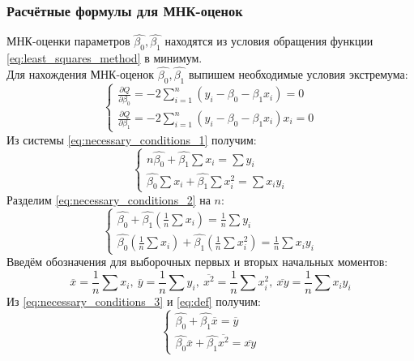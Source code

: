 \subsubsection{Расчётные формулы для МНК-оценок}
МНК-оценки параметров $\hat{\beta_0}, \hat{\beta_1}$ находятся из условия обращения функции \eqref{eq:least_squares_method} в минимум. \\
Для нахождения МНК-оценок $\hat{\beta_0}, \hat{\beta_1}$ выпишем необходимые условия экстремума:
\begin{equation} \label{eq:necessary_conditions_1}
	\begin{cases}
		\frac{\partial Q}{\partial \beta_0} = -2 \sum_{i=1}^{n} (y_i - \beta_0 - \beta_1 x_i) = 0 \\
		\frac{\partial Q}{\partial \beta_1} = -2 \sum_{i=1}^{n} (y_i - \beta_0 - \beta_1 x_i)x_i = 0 
	\end{cases}
\end{equation}
Из системы \eqref{eq:necessary_conditions_1} получим:
\begin{equation}
	\begin{cases} \label{eq:necessary_conditions_2}
		n \hat{\beta_0} + \hat{\beta_1} \sum x_i = \sum y_i \\
		\hat{\beta_0} \sum x_i + \hat{\beta_1} \sum x_{i}^2 = \sum x_i y_i
	\end{cases}
\end{equation}
Разделим \eqref{eq:necessary_conditions_2} на $n$:
\begin{equation} \label{eq:necessary_conditions_3}
	\begin{cases}
		\hat{\beta_0} + \hat{\beta_1} (\frac{1}{n} \sum x_i) = \frac{1}{n} \sum y_i \\
		\hat{\beta_0} (\frac{1}{n} \sum x_i) + \hat{\beta_1} (\frac{1}{n} \sum x_{i}^2) = \frac{1}{n} \sum x_i y_i
	\end{cases}
\end{equation}
Введём обозначения для выборочных первых и вторых начальных моментов:
\begin{equation} \label{eq:def}
	\overline{x} = \frac{1}{n} \sum x_i, \ \overline{y} = \frac{1}{n} \sum y_i, \ \overline{x^2} = \frac{1}{n} \sum x_{i}^2, \ \overline{x y} = \frac{1}{n} \sum x_i y_i
\end{equation}
Из \eqref{eq:necessary_conditions_3} и \eqref{eq:def} получим:
\begin{equation} \label{eq:necessary_conditions_fin}
	\begin{cases}
		\hat{\beta_0} + \hat{\beta_1} \overline{x} = \overline{y} \\
		\hat{\beta_0} \overline{x} + \hat{\beta_1} \overline{x^2} = \overline{x y}
	\end{cases}
\end{equation}
